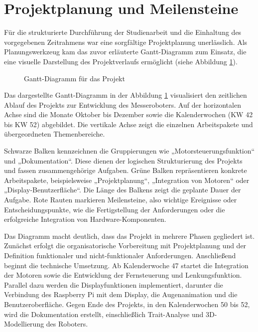 \section{Projektplanung und Meilensteine}
\label{cha:Projektplanung und Meilensteine}

Für die strukturierte Durchführung der Studienarbeit und die Einhaltung des vorgegebenen Zeitrahmens war eine sorgfältige Projektplanung unerlässlich. Als Planungswerkzeug kam das zuvor erläuterte Gantt-Diagramm zum Einsatz, die eine visuelle Darstellung des Projektverlaufs ermöglicht (siehe Abbildung \ref{fig:Gantt1}).

\newpage
\begin{figure}[H]
	
	\vspace{1cm}
	\caption{Gantt-Diagramm für das Projekt}		
	\label{fig:Gantt1}
\end{figure}

\newpage

Das dargestellte Gantt-Diagramm in der Abbildung \ref{fig:Gantt1} visualisiert den zeitlichen Ablauf des Projekts zur Entwicklung des Messeroboters. Auf der horizontalen Achse sind die Monate Oktober bis Dezember sowie die Kalenderwochen (KW 42 bis KW 52) abgebildet. Die vertikale Achse zeigt die einzelnen Arbeitspakete und übergeordneten Themenbereiche.

Schwarze Balken kennzeichnen die Gruppierungen wie „Motorsteuerungsfunktion“ und „Dokumentation“. Diese dienen der logischen Strukturierung des Projekts und fassen zusammengehörige Aufgaben. Grüne Balken repräsentieren konkrete Arbeitspakete, beispielsweise „Projektplanung“, „Integration von Motoren“ oder „Display-Benutzerfläche“. Die Länge des Balkens zeigt die geplante Dauer der Aufgabe. Rote Rauten markieren Meilensteine, also wichtige Ereignisse oder Entscheidungspunkte, wie die Fertigstellung der Anforderungen oder die erfolgreiche Integration von Hardware-Komponenten.

Das Diagramm macht deutlich, dass das Projekt in mehrere Phasen gegliedert ist. Zunächst erfolgt die organisatorische Vorbereitung mit Projektplanung und der Definition funktionaler und nicht-funktionaler Anforderungen. Anschließend beginnt die technische Umsetzung. Ab Kalenderwoche 47 startet die Integration der Motoren sowie die Entwicklung der Fernsteuerung und Lenkungsfunktion. Parallel dazu werden die Displayfunktionen implementiert, darunter die Verbindung des Raspberry Pi mit dem Display, die Augenanimation und die Benutzeroberfläche. Gegen Ende des Projekts, in den Kalenderwochen 50 bis 52, wird die Dokumentation erstellt, einschließlich Trait-Analyse und 3D-Modellierung des Roboters.

